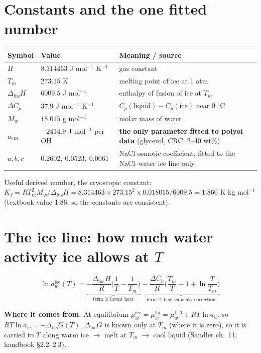 \documentclass[11pt,a4paper]{article}
\newcommand{\dfus}{\Delta_{\mathrm{fus}}}
\newcommand{\aoh}{a_{\mathrm{OH}}}
\newcommand{\aice}{\ln a_w^{\mathrm{ice}}}
\begin{document}
\section*{Constants and the one fitted number}
\begin{tabularx}{\textwidth}{@{}l l L@{}}
\toprule
Symbol & Value & Meaning / source\\
\midrule
$R$ & $8.314463$ J mol$^{-1}$ K$^{-1}$ & gas constant\\
$T_m$ & $273.15$ K & melting point of ice at 1 atm\\
$\dfus H$ & $6009.5$ J mol$^{-1}$ & enthalpy of fusion of ice at $T_m$\\
$\Delta C_p$ & $37.9$ J mol$^{-1}$ K$^{-1}$ & $C_p(\text{liquid})-C_p(\text{ice})$ near 0 $^\circ$C\\
$M_w$ & $18.015$ g mol$^{-1}$ & molar mass of water\\
$\aoh$ & $-2414.9$ J mol$^{-1}$ per OH & \textbf{the only parameter fitted to polyol data} (glycerol, CRC, 2--40 wt\%)\\
$a,b,c$ & $0.2602,\ 0.0523,\ 0.0061$ & NaCl osmotic coefficient, fitted to the NaCl--water ice line only\\
\bottomrule
\end{tabularx}

Useful derived number, the cryoscopic constant: $K_f=RT_m^2M_w/\dfus H=8.314463\times273.15^2\times0.018015/6009.5=1.860$ K kg mol$^{-1}$
(textbook value 1.86, so the constants are consistent).

\section{The ice line: how much water activity ice allows at $T$}
\begin{eqbox}
\[
\aice(T)=\underbrace{-\frac{\dfus H}{R}\Big(\frac1T-\frac1{T_m}\Big)}_{\text{term 1: latent heat}}
\;\underbrace{-\;\frac{\Delta C_p}{R}\Big(\frac{T_m}{T}-1+\ln\frac{T}{T_m}\Big)}_{\text{term 2: heat-capacity correction}}
\tag{1}\]
\end{eqbox}
\textbf{Where it comes from.} At equilibrium $\mu_w^{\text{ice}}=\mu_w^{\text{liq}}=\mu_w^{\text{L},0}+RT\ln a_w$, so
$RT\ln a_w=-\dfus G(T)$. $\dfus G$ is known only at $T_m$ (where it is zero), so it is carried to $T$ along
warm ice $\rightarrow$ melt at $T_m$ $\rightarrow$ cool liquid (Sandler ch.~11; handbook \S2.2--2.3).
\end{document}
